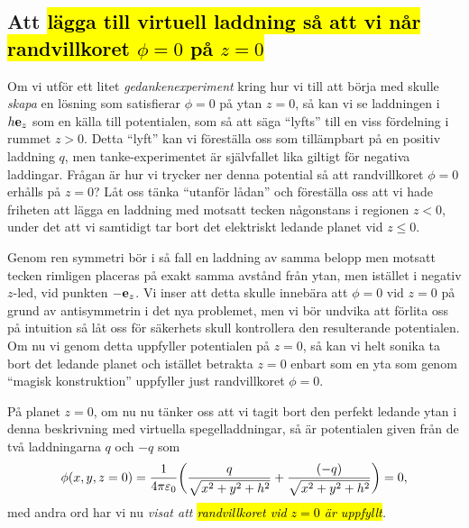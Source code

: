 {{\subsection{Att {\hl{l{\"a}gga till virtuell laddning s{\aa} att vi n{\aa}r
  randvillkoret $\phi=0$ p{\aa} $z=0$}}}
Om vi utf{\"o}r ett litet {\it gedankenexperiment} kring hur vi till att
b{\"o}rja med skulle {\it skapa} en l{\"o}sning som satisfierar $\phi=0$ p{\aa}
ytan $z=0$, s{\aa} kan vi se laddningen i $h{\bf e}_z$ som en k{\"a}lla till
potentialen, som s{\aa} att s{\"a}ga ``lyfts'' till en viss f{\"o}rdelning i
rummet $z>0$. Detta ``lyft'' kan vi f{\"o}rest{\"a}lla oss som till{\"a}mpbart
p{\aa} en positiv laddning $q$, men tanke-experimentet {\"a}r sj{\"a}lvfallet
lika giltigt f{\"o}r negativa laddingar. Fr{\aa}gan {\"a}r hur vi trycker
ner denna potential s{\aa} att randvillkoret $\phi=0$ erh{\aa}lls p{\aa} $z=0$?
\noindent
L{\aa}t oss t{\"a}nka ``utanf{\"o}r l{\aa}dan'' och f{\"o}rest{\"a}lla oss att
vi hade friheten att l{\"a}gga en laddning med motsatt tecken n{\aa}gonstans i
regionen $z<0$, under det att vi samtidigt tar bort det elektriskt ledande
planet
vid $z\le0$.

Genom ren symmetri b{\"o}r i s{\aa} fall en laddning av samma belopp men motsatt
tecken rimligen placeras p{\aa} exakt samma avst{\aa}nd fr{\aa}n ytan, men
ist{\"a}llet i negativ $z$-led, vid punkten $-{\bf e}_z$.
Vi inser att detta skulle inneb{\"a}ra att $\phi=0$ vid $z=0$ p{\aa} grund av
antisymmetrin i det nya problemet, men vi b{\"o}r undvika att f{\"o}rlita oss
p{\aa} intuition s{\aa} l{\aa}t oss f{\"o}r s{\"a}kerhets skull kontrollera den
resulterande potentialen.
Om nu vi genom detta uppfyller potentialen p{\aa} $z=0$, s{\aa} kan vi helt
sonika ta bort det ledande planet och ist{\"a}llet betrakta $z=0$ enbart som
en yta som genom ``magisk konstruktion'' uppfyller just randvillkoret $\phi=0$.
\vfill\eject

P{\aa} planet $z=0$, om nu nu t{\"a}nker oss att vi tagit bort den perfekt
ledande ytan i denna beskrivning med virtuella spegelladdningar, s{\aa} {\"a}r
potentialen given fr{\aa}n de tv{\aa} laddningarna $q$ och $-q$
som
\hl{$$
  \phi(x,y,z=0)={{1}\over{4\pi\varepsilon_0}}\bigg(
    {{q}\over{\sqrt{x^2+y^2+h^2}}}+{{(-q)}\over{\sqrt{x^2+y^2+h^2}}}
  \bigg)=0,
$$}
med andra ord har vi nu {\it visat att {\hl{randvillkoret vid $z=0$ {\"a}r
uppfyllt}}.}

}}
